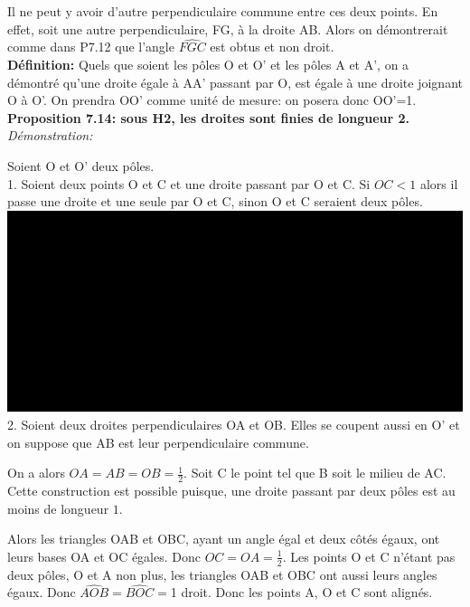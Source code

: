 \documentclass[a4paper, 12pt, twoside]{book}
\begin{document}
   Il ne peut y avoir d'autre perpendiculaire commune entre ces deux points. En effet, soit une autre perpendiculaire, FG, à la droite AB. Alors on démontrerait comme dans P7.12 que l'angle $\hat{FGC}$ est obtus et non droit. \\
   
   \textbf{Définition:} Quels que soient les pôles O et O' et les pôles A et A', on a démontré qu'une droite égale à AA' passant par O, est égale à une droite joignant O à O'. On prendra OO' comme unité de mesure: on posera donc OO'=1.\\
   
   
   
   
   \newpage \textbf{Proposition 7.14: sous H2,    les droites sont finies de longueur 2.}\\
   
\textit{Démonstration:}\ 
  
   Soient O et O' deux pôles. \\
   
  1. Soient deux points O et C et une droite passant par O et C. Si $OC<1$ alors il passe une droite et une seule par O et C, sinon O et C seraient deux pôles. \\
  
   \includegraphics[scale=0.4]{figures/sacc24.eps}\\
   
  2. Soient deux droites perpendiculaires OA et OB. Elles se coupent aussi en O' et on suppose que AB est leur perpendiculaire commune.\
   
   On a alors $OA=AB=OB=\frac{1}{2}$. Soit C le point tel que B soit le milieu de AC. Cette construction est possible puisque, une droite passant par deux pôles est au moins de longueur $1$. \
   
    Alors les triangles OAB et OBC, ayant un angle égal et deux côtés égaux, ont leurs bases OA et OC égales. Donc $OC=OA=\frac{1}{2}$. Les points O et C n'étant pas deux pôles, O et A non plus, les triangles OAB et OBC ont aussi leurs angles égaux. Donc  $\hat{AOB}=\hat{BOC}=$1 droit. Donc les points A, O et C sont alignés.\
   
\end{document}
